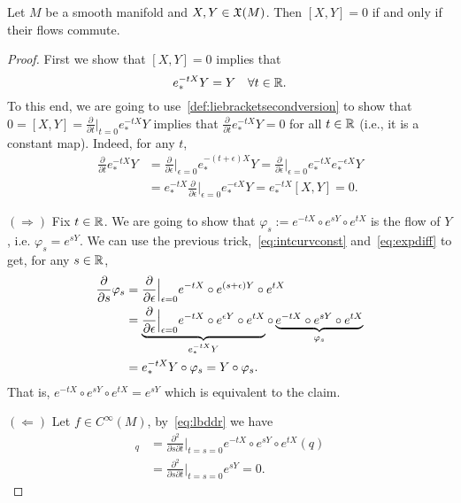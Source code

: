 \begin{proposition}
  Let $M$ be a smooth manifold and $X,Y\in\mathfrak{X}(M)$. Then $[X,Y]=0$ if and only if their flows commute.
\end{proposition}
\begin{proof}
  First we show that $[X,Y] = 0$ implies that
  \begin{equation}\label{eq:intcurvconst}
    e^{-tX}_*Y = Y \quad \forall t\in\mathbb{R}.
  \end{equation}
  To this end, we are going to use~\eqref{def:liebracketsecondversion} to show that $0 = [X,Y] = \frac{\partial}{\partial t}\Big|_{t=0} e_*^{-t X} Y$ implies that $\frac{\partial}{\partial t} e_*^{-t X} Y = 0$ for all $t\in\mathbb{R}$ (i.e., it is a constant map).
  Indeed, for any $t$,
  \begin{align}
    \frac{\partial}{\partial t} e_*^{-t X} Y
     & = \frac{\partial}{\partial \epsilon} \Big|_{\epsilon = 0} e_*^{-(t+\epsilon) X} Y
    = \frac{\partial}{\partial \epsilon} \Big|_{\epsilon = 0} e_*^{-t X}e_*^{-\epsilon X} Y    \\
     & = e_*^{-tX} \frac{\partial}{\partial \epsilon} \Big|_{\epsilon = 0} e_*^{-\epsilon X} Y
    = e_*^{-tX} [X,Y] = 0.
  \end{align}

  $(\Longrightarrow)$ Fix $t\in\mathbb{R}$. We are going to show that $\varphi_s := e^{-tX}\circ e^{sY}\circ e^{tX}$ is the flow of $Y$, i.e. $\varphi_s = e^{sY}$.
  We can use the previous trick,~\eqref{eq:intcurvconst} and~\eqref{eq:expdiff} to get, for any $s\in\mathbb{R}$,
  \begin{align}
    \frac{\partial}{\partial s} \varphi_s
     & = \frac{\partial}{\partial \epsilon} \Big|_{\epsilon = 0} e^{-tX}\circ e^{(s+\epsilon) Y}\circ e^{tX}                                                                                                  \\
     & = \LaTeXunderbrace{\frac{\partial}{\partial \epsilon} \Big|_{\epsilon = 0} e^{-tX}\circ e^{\epsilon Y}\circ e^{tX}}_{e^{-tX}_* Y} \circ \LaTeXunderbrace{e^{-tX}\circ e^{s Y}\circ e^{tX}}_{\varphi_s} \\
     & = e^{-tX}_* Y \circ \varphi_s = Y \circ \varphi_s.
  \end{align}
  That is, $e^{-tX}\circ e^{sY}\circ e^{tX} = e^{sY}$ which is equivalent to the claim.

  $(\Longleftarrow)$ Let $f\in C^\infty(M)$, by~\eqref{eq:lbddr} we have
  \begin{align}
    [X,Y]_q & = \frac{\partial^2}{\partial s \partial t}\Big|_{t=s=0}e^{-tX}\circ e^{sY}\circ e^{t X}(q) \\
            & = \frac{\partial^2}{\partial s \partial t}\Big|_{t=s=0} e^{sY} = 0.
  \end{align}
\end{proof}

